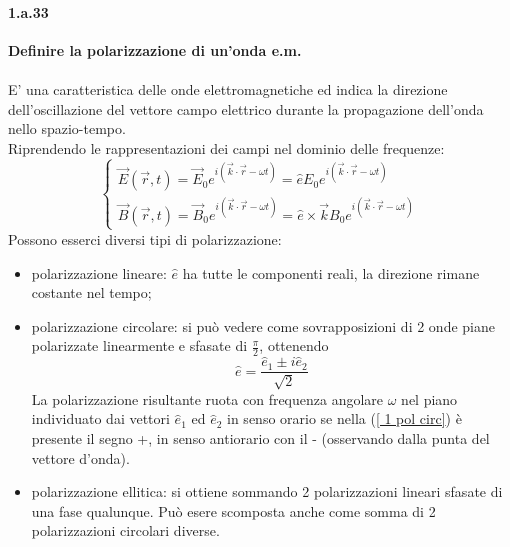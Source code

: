 \documentclass[twoside]{article}
\begin{document}
\paragraph{1.a.33} \textbf{Definire la polarizzazione di un’onda e.m.}\\
\\
E' una caratteristica delle onde elettromagnetiche ed indica la direzione dell'oscillazione del vettore campo elettrico durante la propagazione dell'onda nello spazio-tempo.\\
Riprendendo le rappresentazioni dei campi nel dominio delle frequenze:
\begin{equation}
    \begin{cases}
    \Vec{E}(\Vec{r},t)=\Vec{E}_0 e^{i(\Vec{k}\cdot\Vec{r}-\omega t)}= \hat{e}E_0 e^{i(\Vec{k}\cdot\Vec{r}-\omega t)}\\
    \Vec{B}(\Vec{r},t)=\Vec{B}_0 e^{i(\Vec{k}\cdot\Vec{r}-\omega t)}=\hat{e}\times\vec{k} B_0 e^{i(\Vec{k}\cdot\Vec{r}-\omega t)}
    \end{cases}
\end{equation}
Possono esserci diversi tipi di polarizzazione:
\begin{itemize}
    \item polarizzazione lineare: $\hat{e}$ ha tutte le componenti reali, la direzione rimane costante nel tempo;
    \item polarizzazione circolare: si può vedere come sovrapposizioni di 2 onde piane polarizzate linearmente e sfasate di $\frac{\pi}{2}$, ottenendo 
    \begin{equation}\label{ 1 pol circ}
       \hat{e}=\frac{\hat{e}_1\pm i\hat{e}_2}{\sqrt{2}}
    \end{equation}
    La polarizzazione risultante ruota con frequenza angolare $\omega$ nel piano individuato dai vettori $\hat{e}_1$ ed $\hat{e}_2$ in senso orario se nella (\ref{ 1 pol circ}) è presente il segno +, in senso antiorario con il - (osservando dalla punta del vettore d'onda).
    \item polarizzazione ellitica: si ottiene sommando 2 polarizzazioni lineari sfasate di una fase qualunque. Può esere scomposta anche come somma di 2 polarizzazioni circolari diverse.\\
\end{itemize}
\end{document}
